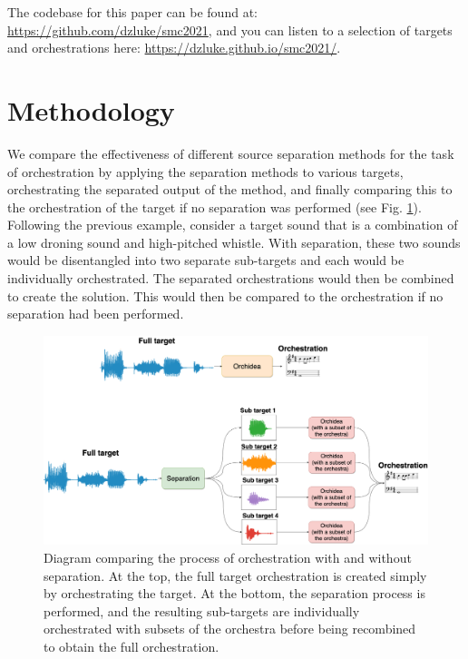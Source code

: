 \documentclass{article}
\begin{document}
	The codebase for this paper can be found at: \mbox{\url{https://github.com/dzluke/smc2021}}, and you can listen to a selection of targets and orchestrations here: \mbox{\url{https://dzluke.github.io/smc2021/}}.
		
	
	\section{Methodology}\label{sec:methodology}
	
	We compare the effectiveness of different source separation methods for the task of orchestration by applying the separation methods to various targets, orchestrating the separated output of the method, and finally comparing this to the orchestration of the target if no separation was performed (see Fig. \ref{fig:full_diagram}). Following the previous example, consider a target sound that is a combination of a low droning sound and high-pitched whistle. With separation, these two sounds would be disentangled into two separate sub-targets and each would be individually orchestrated. The separated orchestrations would then be combined to create the solution. This would then be compared to the orchestration if no separation had been performed.
	
	\begin{figure}[t]
		\centering
			\includegraphics[width=\textwidth]{figures/diagram.png}
			\caption{Diagram comparing the process of orchestration with and without separation. At the top, the full target orchestration is created simply by orchestrating the target. At the bottom, the separation process is performed, and the resulting sub-targets are individually orchestrated with subsets of the orchestra before being recombined to obtain the full orchestration.}\label{fig:full_diagram}
	\end{figure}
	
\end{document}
